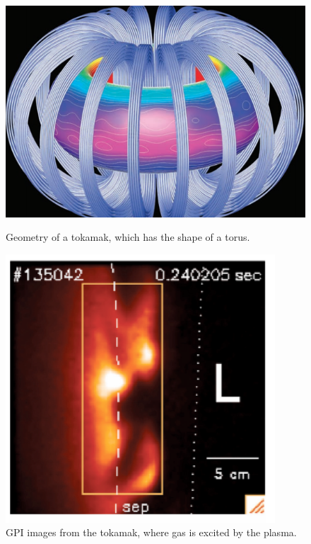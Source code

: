 \documentclass[10pt,conference]{IEEEtran}
\begin{document}
\begin{figure}[!htb]
  \begin{minipage}{.23\textwidth}
    \centering
    \includegraphics[width=\textwidth]{images/tokamak.png}
    \caption{Geometry of a tokamak\cite{tokamak}, which has the shape of a torus.}
    \label{figure:geometrytokamak}
  \end{minipage}%
  \hfill
  \begin{minipage}{.23\textwidth}
    \centering
    \includegraphics[width=\textwidth]{images/blob.PNG}
    \caption{GPI images from the tokamak, where gas is excited by the plasma.\cite{zweben}}
    \label{figure:gpiimage}
  \end{minipage}
\end{figure}
\end{document}

